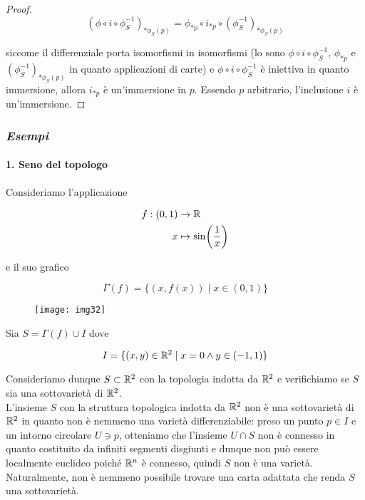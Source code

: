 \begin{proof}
	\begin{equation}
		(\phi \circ i \circ \phi_{S}^{-1})_{*\phi_{S}(p)} = \phi_{*p} \circ i_{*p} \circ (\phi_{S}^{-1})_{*\phi_{S}(p)}
	\end{equation}

	siccome il differenziale porta isomorfismi in isomorfismi (lo sono $ \phi \circ i \circ \phi_{S}^{-1} $, $ \phi_{*p} $ e $ (\phi_{S}^{-1})_{*\phi_{S}(p)} $ in quanto applicazioni di carte) e $ \phi \circ i \circ \phi_{S}^{-1} $ è iniettiva in quanto immersione, allora $ i_{*p} $ è un'immersione in $ p $. Essendo $ p $ arbitrario, l'inclusione $ i $ è un'immersione.
\end{proof}

\subsubsection{\textit{Esempi}}

\paragraph{1. Seno del topologo}

Consideriamo l'applicazione

\begin{align}
	\begin{split}
		f : (0,1) &\to \mathbb{R}\\
		x &\mapsto \sin(\dfrac{1}{x})
	\end{split}
\end{align}

e il suo grafico

\begin{equation}
	\Gamma(f) = \{ (x,f(x)) \mid x \in (0,1) \}
\end{equation}

\begin{figure}[H]
	\centering
	\texttt{[image: img32]}
\end{figure}

Sia $ S = \Gamma(f) \cup I $ dove

\begin{equation}
	I = \{ (x,y) \in \mathbb{R}^{2} \mid x=0 \wedge y \in (-1,1) \}
\end{equation}

Consideriamo dunque $ S \subset \mathbb{R}^{2} $ con la topologia indotta da $ \mathbb{R}^{2} $ e verifichiamo se $ S $ sia una sottovarietà di $ \mathbb{R}^{2} $.\\
L'insieme $ S $ con la struttura topologica indotta da $ \mathbb{R}^{2} $ non è una sottovarietà di $ \mathbb{R}^{2} $ in quanto non è nemmeno una varietà differenziabile: preso un punto $ p \in I $ e un intorno circolare $ U \ni p $, otteniamo che l'insieme $ U \cap S $ non è connesso in quanto costituito da infiniti segmenti disgiunti e dunque non può essere localmente euclideo poiché $ \mathbb{R}^{n} $ è connesso, quindi $ S $ non è una varietà.\\
Naturalmente, non è nemmeno possibile trovare una carta adattata che renda $ S $ una sottovarietà.

